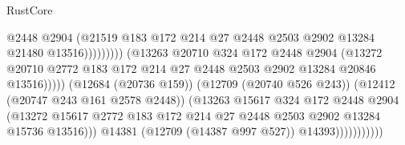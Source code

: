 \begin{lexlean}{RustCore}
\begin{coremodule}
                                                  @2448
                                                  @2904
                                                  (@21519
                                                    @183
                                                    @172
                                                    @214
                                                    @27
                                                    @2448
                                                    @2503
                                                    @2902
                                                    @13284
                                                    @21480
                                                    @13516)))))))))
                                  (@13263
                                    @20710
                                    @324
                                    @172
                                    @2448
                                    @2904
                                    (@13272
                                      @20710
                                      @2772
                                      @183
                                      @172
                                      @214
                                      @27
                                      @2448
                                      @2503
                                      @2902
                                      @13284
                                      @20846
                                      @13516)))))
                            (@12684 (@20736 @159))
                            (@12709 (@20740 @526 @243))
                            (@12412 (@20747 @243 @161 @2578 @2448))
                            (@13263
                              @15617
                              @324
                              @172
                              @2448
                              @2904
                              (@13272
                                @15617
                                @2772
                                @183
                                @172
                                @214
                                @27
                                @2448
                                @2503
                                @2902
                                @13284
                                @15736
                                @13516)))
                          @14381
                          (@12709 (@14387 @997 @527))
                          @14393)))))))))))

\end{coremodule}
\end{lexlean}
